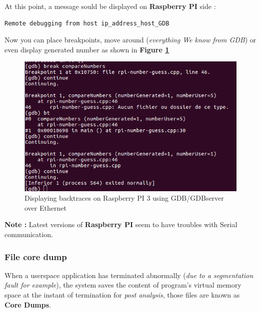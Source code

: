 \begin{enumerate}
	At this point, a message sould be displayed on \textbf{Raspberry PI} side :
	
		\begin{lstlisting}[style=BashInputStyle]
Remote debugging from host ip_address_host_GDB	
    \end{lstlisting}
    
    
Now you can place breakpoints, move around (\emph{everything We know from GDB}) or even display generated number as shown in \textbf{Figure \ref{Displaying backtraces on Raspberry PI 3 using GDB/GDBserver over Ethernet}}    
\begin{figure}[H]
		\centering
        \includegraphics[scale=0.33]{img/solution/gdb-successfull-debug-over-ethernet.png}
        \caption{Displaying backtraces on Raspberry PI 3 using GDB/GDBserver over Ethernet}
        \label{Displaying backtraces on Raspberry PI 3 using GDB/GDBserver over Ethernet}
    \end{figure}    
    

\textbf{\color{orange}Note :} Latest versions of \textbf{Raspberry PI} seem to have troubles with Serial communication.	
\end{enumerate}

\subsubsection{File core dump}
When a userspace application has terminated abnormally (\emph{due to a segmentation fault for example}), the system saves the content of program's virtual memory space at the instant of termination for \textit{post analysis}, those files are known as \textbf{Core Dumps}.

